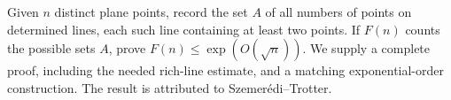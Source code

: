 Given $n$ distinct plane points, record the set $A$ of all numbers of points on determined lines, each such line containing at least two points. If $F(n)$ counts the possible sets $A$, prove $F(n)\leq\exp(O(\sqrt n))$. We supply a complete proof, including the needed rich-line estimate, and a matching exponential-order construction. The result is attributed to Szemer\'edi--Trotter.
